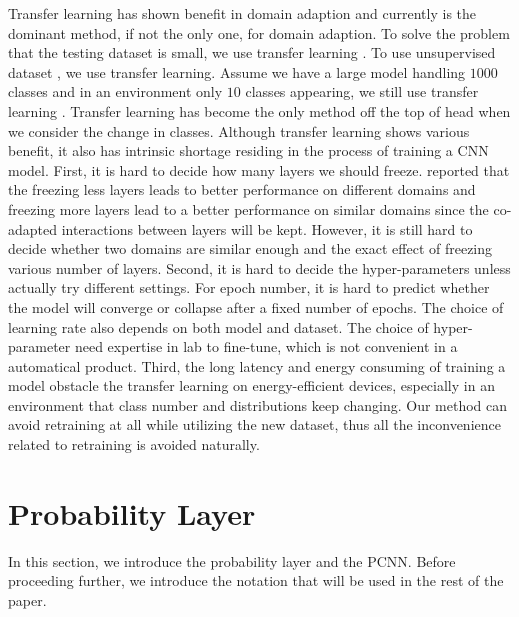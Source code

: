 \documentclass{article}
\begin{document}
Transfer learning has shown benefit in domain adaption and currently is the dominant method, if not the only one, for domain adaption. To solve the problem that the testing dataset is small, we use transfer learning \cite{oquab2014learning}. To use unsupervised dataset \cite{doersch2015unsupervised, noroozi2016unsupervised}, we use transfer learning. Assume we have a large model handling $1000$ classes and in an environment only $10$ classes appearing, we still use transfer learning \cite{han2016mcdnn, shen2017fast}. Transfer learning has become the only method off the top of head when we consider the change in classes. Although transfer learning shows various benefit, it also has intrinsic shortage residing in the process of training a CNN model. First, it is hard to decide how many layers we should freeze. \cite{yosinski2014transferable} reported that the freezing less layers leads to better performance on different domains and freezing more layers lead to a better performance on similar domains since the co-adapted interactions between layers will be kept. However, it is still hard to decide whether two domains are similar enough and the exact effect of freezing various number of layers. Second, it is hard to decide the hyper-parameters unless actually try different settings. For epoch number, it is hard to predict whether the model will converge or collapse after a fixed number of epochs. The choice of learning rate also depends on both model and dataset. The choice of hyper-parameter need expertise in lab to fine-tune, which is not convenient in a automatical product. Third, the long latency and energy consuming of training a model obstacle the transfer learning on energy-efficient devices, especially in an environment that class number and distributions keep changing. Our method can avoid retraining at all while utilizing the new dataset, thus all the inconvenience related to retraining is avoided naturally.

\section{Probability Layer}
In this section, we introduce the probability layer and the PCNN. Before proceeding further, we introduce the notation that will be used in the rest of the paper.
\end{document}

